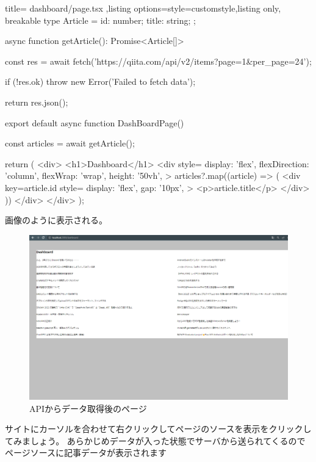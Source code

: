 \begin{tcblisting}{title={
        dashboard/page.tsx
      },listing options={style=customstyle},listing only, breakable}
  type Article = {
    id: number;
    title: string;
  };

  async function getArticle(): Promise<Article[]> {
    const res = await fetch('https://qiita.com/api/v2/items?page=1&per_page=24');

    if (!res.ok) {
        throw new Error('Failed to fetch data');
    }

    return res.json();
  }

  export default async function DashBoardPage() {
    const articles = await getArticle();

    return (
      <div>
        <h1>Dashboard</h1>
        <div
        style={{
            display: 'flex',
            flexDirection: 'column',
            flexWrap: 'wrap',
            height: '50vh',
          }}
        >
          {articles?.map((article) => (
            <div
            key={article.id}
            style={{
                display: 'flex',
                gap: '10px',
              }}
            >
              <p>{article.title}</p>
            </div>
            ))}
        </div>
      </div>
    );
  }


\end{tcblisting}






画像のように表示される。

\begin{figure}[H]
  \centering
  \includegraphics[width=12cm]{./image/03-Tech/chap4/06.png}
  \caption{APIからデータ取得後のページ}
\end{figure}


サイトにカーソルを合わせて右クリックしてページのソースを表示をクリックしてみましょう。
あらかじめデータが入った状態でサーバから送られてくるのでページソースに記事データが表示されます



